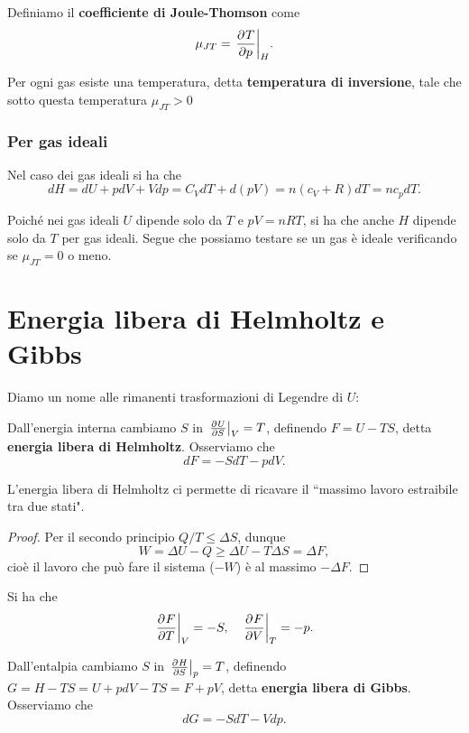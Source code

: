 \begin{definition}
Definiamo il \textbf{coefficiente di Joule-Thomson} come
\[\mu_{JT}=\ppb pTH.\]
\end{definition}
\begin{fact}
Per ogni gas esiste una temperatura, detta \textbf{temperatura di inversione}, tale che sotto questa temperatura $\mu_{JT}>0$
\end{fact}

\subsubsection{Per gas ideali}
Nel caso dei gas ideali si ha che
\[dH=dU+pdV+Vdp=C_VdT+d(pV)=n(c_V+R)dT=nc_pdT.\]
\begin{remark}
Poich\'e nei gas ideali $U$ dipende solo da $T$ e $pV=nRT$, si ha che anche $H$ dipende solo da $T$ per gas ideali. Segue che possiamo testare se un gas \`e ideale verificando se $\mu_{JT}=0$ o meno.
\end{remark}


\section{Energia libera di Helmholtz e Gibbs}
\noindent
Diamo un nome alle rimanenti trasformazioni di Legendre di $U$:
\begin{definition}
Dall'energia interna cambiamo $S$ in $\ppb SUV=T$, definendo $F=U-TS$, detta \textbf{energia libera di Helmholtz}. Osserviamo che
\[dF=-SdT-pdV.\]
\end{definition}

\begin{remark}
L'energia libera di Helmholtz ci permette di ricavare il ``massimo lavoro estraibile tra due stati".
\end{remark}
\begin{proof}
Per il secondo principio $Q/T\leq \Delta S$, dunque
\[W=\Delta U-Q\geq \Delta U-T\Delta S=\Delta F,\]
cio\`e il lavoro che pu\`o fare il sistema ($-W$) \`e al massimo $-\Delta F$.
\end{proof}

\begin{remark}
Si ha che
\[\ppb TFV=-S,\quad \ppb VFT=-p.\]
\end{remark}

\begin{definition}
Dall'entalpia cambiamo $S$ in $\ppb SHp=T$, definendo $G=H-TS=U+pdV-TS=F+pV$, detta \textbf{energia libera di Gibbs}. Osserviamo che
\[dG=-SdT-Vdp.\]
\end{definition}

